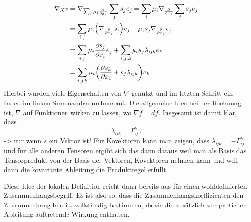 \begin{align}
\nabla_X s &= \nabla_{\sum_i \mu_i \pdv{x_i}} \sum_j s_j e_j = \sum_i \mu_i \nabla_{\pdv{x_i}} \sum_j s_j e_j
\notag\\
&= \sum_{i, j} \mu_i \qty(\nabla_{\pdv{x_i}} s_j) e_j + \mu_i s_j \nabla_{\pdv{x_i}} e_j
\notag\\
&= \sum_{i, j} \mu_i \pdv{s_j}{x_i} e_j + \sum_{i, j, k} \mu_i s_j \lambda_{ijk} e_k
\notag\\
&= \sum_{i, j, k} \mu_i \qty(\pdv{s_k}{x_i} + s_j \lambda_{ijk}) e_k \, .
\end{align}
Hierbei wurden viele Eigenschaften von $\nabla$ genutzt und im letzten Schritt ein Index im linken Summanden umbenannt. Die allgemeine Idee bei der Rechnung ist, $\nabla$ auf Funktionen wirken zu lassen, wo $\nabla f = df$. Insgesamt ist damit klar, dass
\begin{equation}
\lambda_{ijk} = \Gamma_{ij}^k \, .%
\end{equation}
-> nur wenn $s$ ein Vektor ist! Für Kovektoren kann man zeigen, dass $\lambda_{ijk} = - \Gamma_{ij}^k$ und für alle anderen Tensoren ergibt sich das dann daraus weil man als Basis das Tensorprodukt von der Basis der Vektoren, Kovektoren nehmen kann und weil dann die kovariante Ableitung die Produktregel erfüllt

Diese Idee der lokalen Definition reicht dann bereits aus für einen wohldefinierten Zusammenhangsbegriff. Es ist also so, dass die Zusammenhangskoeffizienten den Zusammenhang bereits vollständig bestimmen, da sie die zusätzlich zur partiellen Ableitung auftretende Wirkung enthalten.

